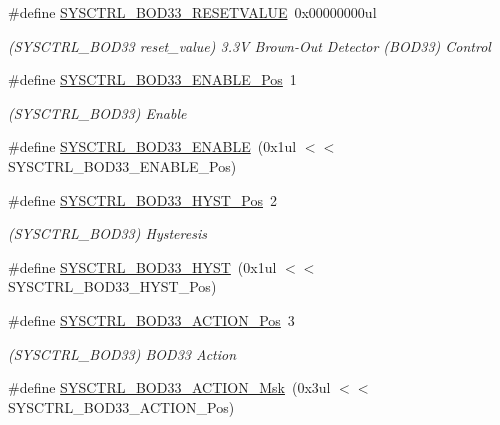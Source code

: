 \begin{DoxyCompactItemize}
\#define \mbox{\hyperlink{group___s_a_m_d21___s_y_s_c_t_r_l_gaefaf46bab336eb3a756e222e4759d8c8}{S\+Y\+S\+C\+T\+R\+L\+\_\+\+B\+O\+D33\+\_\+\+R\+E\+S\+E\+T\+V\+A\+L\+UE}}~0x00000000ul
\begin{DoxyCompactList}\small\item\em (S\+Y\+S\+C\+T\+R\+L\+\_\+\+B\+O\+D33 reset\+\_\+value) 3.\+3V Brown-\/\+Out Detector (B\+O\+D33) Control \end{DoxyCompactList}\item 
\#define \mbox{\hyperlink{group___s_a_m_d21___s_y_s_c_t_r_l_ga39f9eb312de129bc6afd59fe6ed106be}{S\+Y\+S\+C\+T\+R\+L\+\_\+\+B\+O\+D33\+\_\+\+E\+N\+A\+B\+L\+E\+\_\+\+Pos}}~1
\begin{DoxyCompactList}\small\item\em (S\+Y\+S\+C\+T\+R\+L\+\_\+\+B\+O\+D33) Enable \end{DoxyCompactList}\item 
\#define \mbox{\hyperlink{group___s_a_m_d21___s_y_s_c_t_r_l_ga02a6972cd168203638f2e300e2b0ff46}{S\+Y\+S\+C\+T\+R\+L\+\_\+\+B\+O\+D33\+\_\+\+E\+N\+A\+B\+LE}}~(0x1ul $<$$<$ S\+Y\+S\+C\+T\+R\+L\+\_\+\+B\+O\+D33\+\_\+\+E\+N\+A\+B\+L\+E\+\_\+\+Pos)
\item 
\#define \mbox{\hyperlink{group___s_a_m_d21___s_y_s_c_t_r_l_gabf6f0c22a4880444ba6e2e7888c0cb2d}{S\+Y\+S\+C\+T\+R\+L\+\_\+\+B\+O\+D33\+\_\+\+H\+Y\+S\+T\+\_\+\+Pos}}~2
\begin{DoxyCompactList}\small\item\em (S\+Y\+S\+C\+T\+R\+L\+\_\+\+B\+O\+D33) Hysteresis \end{DoxyCompactList}\item 
\#define \mbox{\hyperlink{group___s_a_m_d21___s_y_s_c_t_r_l_ga00e9bf33ae02e1d13e445a96cd338753}{S\+Y\+S\+C\+T\+R\+L\+\_\+\+B\+O\+D33\+\_\+\+H\+Y\+ST}}~(0x1ul $<$$<$ S\+Y\+S\+C\+T\+R\+L\+\_\+\+B\+O\+D33\+\_\+\+H\+Y\+S\+T\+\_\+\+Pos)
\item 
\#define \mbox{\hyperlink{group___s_a_m_d21___s_y_s_c_t_r_l_ga6c20697ad258d59880069fb26f672189}{S\+Y\+S\+C\+T\+R\+L\+\_\+\+B\+O\+D33\+\_\+\+A\+C\+T\+I\+O\+N\+\_\+\+Pos}}~3
\begin{DoxyCompactList}\small\item\em (S\+Y\+S\+C\+T\+R\+L\+\_\+\+B\+O\+D33) B\+O\+D33 Action \end{DoxyCompactList}\item 
\#define \mbox{\hyperlink{group___s_a_m_d21___s_y_s_c_t_r_l_ga85f369a6fbff36f2617d7d4a3e66a784}{S\+Y\+S\+C\+T\+R\+L\+\_\+\+B\+O\+D33\+\_\+\+A\+C\+T\+I\+O\+N\+\_\+\+Msk}}~(0x3ul $<$$<$ S\+Y\+S\+C\+T\+R\+L\+\_\+\+B\+O\+D33\+\_\+\+A\+C\+T\+I\+O\+N\+\_\+\+Pos)
$$
\end{DoxyCompactItemize}

